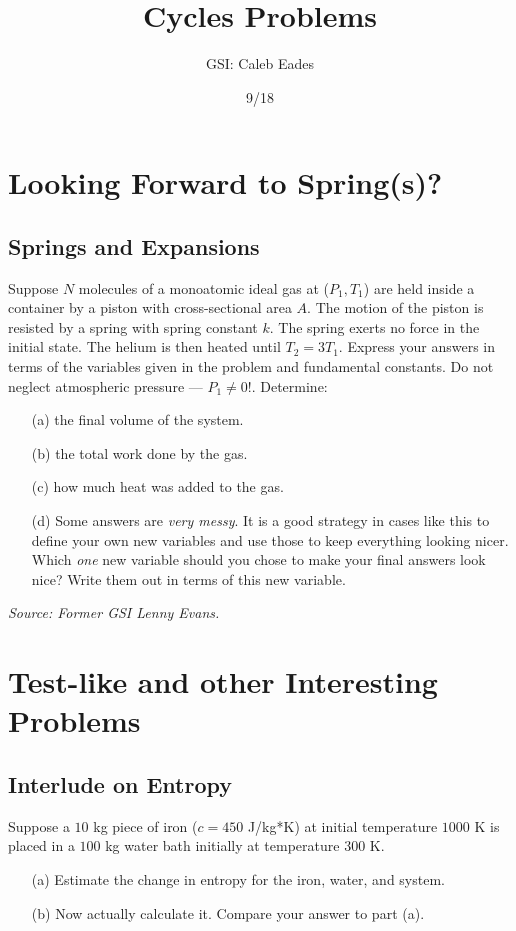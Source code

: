 \documentclass{article}
\begin{document}
\title{Cycles Problems}
\author{GSI: Caleb Eades}
\date{9/18}
\maketitle

\section{Looking Forward to Spring(s)?}

\subsection{Springs and Expansions}

Suppose $N$ molecules of a monoatomic ideal gas at ($P_1, T_1$) are held inside a container by a piston with cross-sectional area $A$.  The motion of the piston is resisted by a spring with spring constant $k$. The spring exerts no force in the initial state. The helium is then heated until $T_2 = 3 T_1$. Express your answers in terms of the variables given in the problem and fundamental constants. Do not neglect atmospheric pressure --- $P_1 \neq 0$!. Determine:
\begin{itemize}
	\item[(a)] the final volume of the system.
	\item[(b)] the total work done by the gas.
	\item[(c)] how much heat was added to the gas.
	\item[(d)] Some answers are \textit{very messy}. It is a good strategy in cases like this to define your own new variables and use those to keep everything looking nicer. Which \textit{one} new variable should you chose to make your final answers look nice? Write them out in terms of this new variable.
\end{itemize}

\textit{Source: Former GSI Lenny Evans.}

\section{Test-like and other Interesting Problems}

\subsection{Interlude on Entropy}

Suppose a $10$ kg piece of iron ($c=450$ J/kg*K) at initial temperature $1000$ K is placed in a $100$ kg water bath initially at temperature $300$ K.
\begin{itemize}
	\item[(a)] Estimate the change in entropy for the iron, water, and system.
	\item[(b)] Now actually calculate it. Compare your answer to part (a).
\end{itemize}
\end{document}
